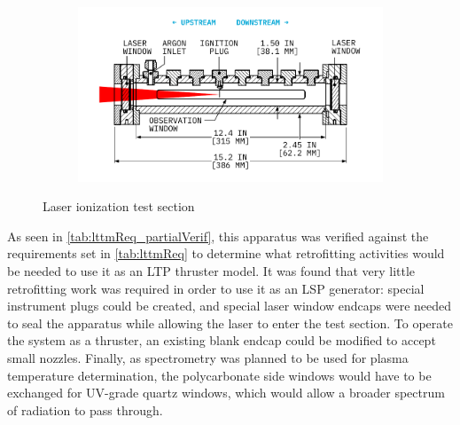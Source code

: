 \begin{figure}[h]
\begin{subfigure}[t]{0.49\textwidth}
                    \label{fig:cavitation_photo}
                \end{subfigure}
                \begin{subfigure}[t]{\textwidth}
                    \centering
                    \includegraphics[]{assets/3 design/testsection_layout.pdf}
                    \caption{}
                    \label{fig:cavitation_dimensions}
                \end{subfigure}
                \caption{Laser ionization test section}
                \label{fig:cavitation}
            \end{figure}

            As seen in \autoref{tab:lttmReq_partialVerif}, this apparatus was verified against the requirements set in \autoref{tab:lttmReq} to determine what retrofitting activities would be needed to use it as an LTP thruster model. It was found that very little retrofitting work was required in order to use it as an LSP generator: special instrument plugs could be created, and special laser window endcaps were needed to seal the apparatus while allowing the laser to enter the test section. To operate the system as a thruster, an existing blank endcap could be modified to accept small nozzles. Finally, as spectrometry was planned to be used for plasma temperature determination, the polycarbonate side windows would have to be exchanged for UV-grade quartz windows, which would allow a broader spectrum of radiation to pass through.
        
